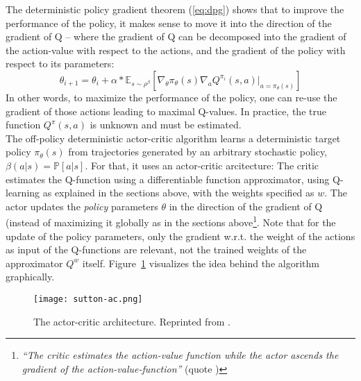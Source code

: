 The deterministic policy gradient theorem (\ref{eq:dpg}) shows that to improve the performance of the policy, it makes sense to move it into the direction of the gradient of Q -- where the gradient of Q can be decomposed into the gradient of the action-value with respect to the actions, and the gradient of the policy with respect to its parameters:
\begin{equation*}
	\theta_{i+1} = \theta_i + \alpha * \mathds{E}_{s \sim \rho^\beta} \left[ \nabla_\theta \pi_{\theta}(s) \nabla_a Q^{\pi_i}(s,a) \big|_{a=\pi_\theta(s)} \right]
\end{equation*} 
In other words, to maximize the performance of the policy, one can re-use the gradient of those actions leading to maximal Q-values. In practice, the true function $Q^\pi(s,a)$ is unknown and must be estimated.\\

\noindent The off-policy deterministic actor-critic algorithm learns a deterministic target policy $\pi_\theta(s)$ from trajectories generated by an arbitrary stochastic policy, $\beta(a|s) = \mathds{P}[a|s]$. For that, it uses an actor-critic arcitecture: The critic estimates the Q-function using a differentiable function approximator, using Q-learning as explained in the sections above, with the weights specified as $w$. The actor updates the \textit{policy} parameters $\theta$ in the direction of the gradient of Q (instead of maximizing it globally as in the sections above\footnote{\textit{``The critic estimates the action-value function while the actor ascends the gradient of the action-value-function''} (quote \cite{silver_deterministic_2014})}. Note that for the update of the policy parameters, only the gradient w.r.t. the weight of the actions as input of the Q-functions are relevant, not the trained weights of the approximator $Q^w$ itself. Figure~\ref{fig:actorcritic} visualizes the idea behind the algorithm graphically.
\begin{figure}[h]
	\texttt{[image: sutton-ac.png]}
	\centering
	\caption{The actor-critic architecture. Reprinted from \cite{richard_s._sutton_reinforcement_1998}.}
	\label{fig:actorcritic}
\end{figure}


